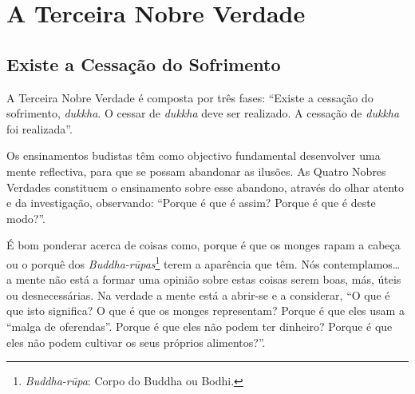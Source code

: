 
\chapter{A Terceira Nobre Verdade}

\pagestyle{topbottomcorner}

\section{Existe a Cessação do Sofrimento}

A Terceira Nobre Verdade é composta por três fases: “Existe a cessação do
sofrimento, \emph{dukkha}. O cessar de \emph{dukkha} deve ser realizado. A
cessação de \emph{dukkha} foi realizada”.

Os ensinamentos budistas têm como objectivo fundamental desenvolver uma mente
reflectiva, para que se possam abandonar as ilusões. As Quatro Nobres Verdades
constituem o ensinamento sobre esse abandono, através do olhar atento e da
investigação, observando: “Porque é que é assim? Porque é que é deste modo?”.

É bom ponderar acerca de coisas como, porque é que os monges rapam a cabeça ou o
porquê dos \emph{Buddha-rūpas}\footnote{%
  \emph{Buddha-rūpa}: Corpo do Buddha ou Bodhi.} terem a aparência que têm. Nós
contemplamos\ldots{} a mente não está a formar uma opinião sobre estas coisas
serem boas, más, úteis ou desnecessárias. Na verdade a mente está a abrir-se e a
considerar, “O que é que isto significa? O que é que os monges representam?
Porque é que eles usam a “malga de oferendas”. Porque é que eles não podem ter
dinheiro? Porque é que eles não podem cultivar os seus próprios alimentos?”.

